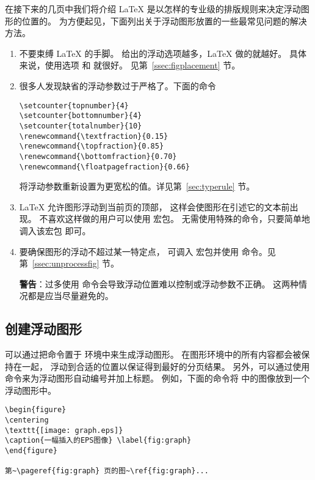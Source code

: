 在接下来的几页中我们将介绍 \LaTeX{} 是以怎样的专业级的排版规则来决定浮动图形的位置的。
为方便起见，下面列出关于浮动图形放置的一些最常见问题的解决方法。
\begin{enumerate}
	\item 不要束缚 \LaTeX{} 的手脚。
	给出的浮动选项越多，\LaTeX{} 做的就越好。
	具体来说，使用选项 \opt{[htbp]} 和 \opt{[tbp]}	就很好。
	见第~\ref{ssec:figplacement} 节。
	
	\item 很多人发现缺省的浮动参数过于严格了。下面的命令
\begin{lstlisting}
\setcounter{topnumber}{4}
\setcounter{bottomnumber}{4}
\setcounter{totalnumber}{10}
\renewcommand{\textfraction}{0.15}
\renewcommand{\topfraction}{0.85}
\renewcommand{\bottomfraction}{0.70}
\renewcommand{\floatpagefraction}{0.66}
\end{lstlisting}
	将浮动参数重新设置为更宽松的值。详见第~\ref{sec:typerule} 节。
	
	\item \LaTeX{} 允许图形浮动到当前页的顶部，
	这样会使图形在引述它的文本前出现。
	不喜欢这样做的用户可以使用  宏包。
	无需使用特殊的命令，只要简单地调入该宏包  即可。
	
	\item 要确保图形的浮动不超过某一特定点，
	可调入  宏包并使用  命令。见第~\ref{ssec:unprocessfig} 节。
	
	\textbf{警告}：过多使用 	命令会导致浮动位置难以控制或浮动参数不正确。
	这两种情况都是应当尽量避免的。
\end{enumerate}

\subsection{创建浮动图形}\label{ssec:createfloatfig}
可以通过把命令置于  环境中来生成浮动图形。
在图形环境中的所有内容都会被保持在一起，
浮动到合适的位置以保证得到最好的分页结果。
另外，可以通过使用  命令来为浮动图形自动编号并加上标题。
例如，下面的命令将  中的图像放到一个浮动图形中。
\begin{lstlisting}
\begin{figure} 
\centering 
\texttt{[image: graph.eps]} 
\caption{一幅插入的EPS图像} \label{fig:graph} 
\end{figure}

第~\pageref{fig:graph} 页的图~\ref{fig:graph}...
\end{lstlisting}

